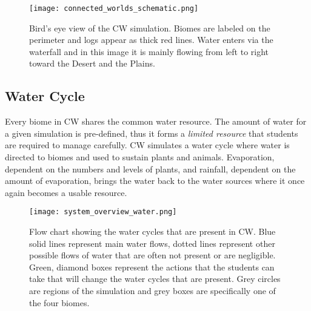 \begin{figure}
\centering
\texttt{[image: connected\_worlds\_schematic.png]}
\caption{Bird's eye view of the CW simulation. Biomes are labeled on the perimeter and logs appear as thick red lines. Water enters via the waterfall and in this image it is mainly flowing from left to right toward the Desert and the Plains.}
\label{fig:connected_worlds_graphic}
\end{figure}




\subsection{Water Cycle}
Every biome in CW shares the common water resource. The amount of water for a given simulation is pre-defined, thus it forms a \textit{limited resource} that students are required to manage carefully. CW simulates a water cycle where water is directed to biomes and used to sustain plants and animals. Evaporation, dependent on the numbers and levels of plants, and rainfall, dependent on the amount of evaporation, brings the water back to the water sources where it once again becomes a usable resource.

\begin{figure}
\centering
\texttt{[image: system\_overview\_water.png]}
\caption{Flow chart showing the water cycles that are present in CW. Blue solid lines represent main water flows, dotted lines represent other possible flows of water that are often not present or are negligible. Green, diamond boxes represent the actions that the students can take that will change the water cycles that are present. Grey circles are regions of the simulation and grey boxes are specifically one of the four biomes.}
\label{fig:system_overview_water}
\end{figure}

